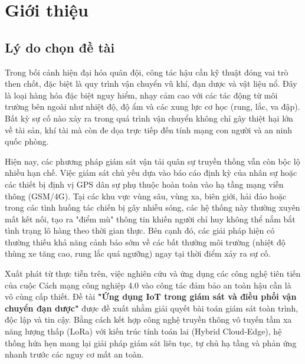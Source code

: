 \chapter{Giới thiệu}

\section{Lý do chọn đề tài}
Trong bối cảnh hiện đại hóa quân đội, công tác hậu cần kỹ thuật đóng vai trò then chốt, đặc biệt là quy trình vận chuyển vũ khí, đạn dược và vật liệu nổ. Đây là loại hàng hóa đặc biệt nguy hiểm, nhạy cảm cao với các tác động từ môi trường bên ngoài như nhiệt độ, độ ẩm và các xung lực cơ học (rung, lắc, va đập). Bất kỳ sự cố nào xảy ra trong quá trình vận chuyển không chỉ gây thiệt hại lớn về tài sản, khí tài mà còn đe dọa trực tiếp đến tính mạng con người và an ninh quốc phòng.

Hiện nay, các phương pháp giám sát vận tải quân sự truyền thống vẫn còn bộc lộ nhiều hạn chế. Việc giám sát chủ yếu dựa vào báo cáo định kỳ của nhân sự hoặc các thiết bị định vị GPS dân sự phụ thuộc hoàn toàn vào hạ tầng mạng viễn thông (GSM/4G). Tại các khu vực vùng sâu, vùng xa, biên giới, hải đảo hoặc trong các tình huống tác chiến bị gây nhiễu sóng, các hệ thống này thường xuyên mất kết nối, tạo ra "điểm mù" thông tin khiến người chỉ huy không thể nắm bắt tình trạng lô hàng theo thời gian thực. Bên cạnh đó, các giải pháp hiện có thường thiếu khả năng cảnh báo sớm về các bất thường môi trường (nhiệt độ thùng xe tăng cao, rung lắc quá ngưỡng) ngay tại thời điểm xảy ra sự cố.

Xuất phát từ thực tiễn trên, việc nghiên cứu và ứng dụng các công nghệ tiên tiến của cuộc Cách mạng công nghiệp 4.0 vào công tác đảm bảo an toàn hậu cần là vô cùng cấp thiết. Đề tài \textbf{"Ứng dụng IoT trong giám sát và điều phối vận chuyển đạn dược"} được đề xuất nhằm giải quyết bài toán giám sát toàn trình, độc lập và tin cậy. Bằng cách kết hợp công nghệ truyền thông vô tuyến tầm xa năng lượng thấp (LoRa) với kiến trúc tính toán lai (Hybrid Cloud-Edge), hệ thống hứa hẹn mang lại giải pháp giám sát liên tục, tự chủ hạ tầng và phản ứng nhanh trước các nguy cơ mất an toàn.
